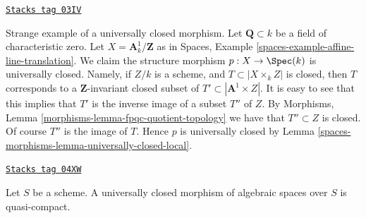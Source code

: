 \begin{example}
\label{spaces-morphisms-example-strange-universally-closed}
\href{https://stacks.math.columbia.edu/tag/03IV}{\texttt{Stacks tag 03IV}}

Strange example of a universally closed morphism.
Let $\mathbf{Q} \subset k$ be a field of characteristic zero.
Let $X = \mathbf{A}^1_k/\mathbf{Z}$ as in
Spaces, Example \ref{spaces-example-affine-line-translation}.
We claim the structure morphism $p : X \to \Spec(k)$
is universally closed.
Namely, if $Z/k$ is a scheme, and $T \subset |X \times_k Z|$ is closed,
then $T$ corresponds to a $\mathbf{Z}$-invariant closed subset of
$T' \subset |\mathbf{A}^1 \times Z|$. It is easy to see that
this implies that $T'$ is the inverse image of a subset $T''$ of
$Z$. By
Morphisms, Lemma \ref{morphisms-lemma-fpqc-quotient-topology}
we have that $T'' \subset Z$ is closed.
Of course $T''$ is the image of $T$. Hence $p$ is universally
closed by Lemma \ref{spaces-morphisms-lemma-universally-closed-local}.
\end{example}

\begin{lemma}
\label{spaces-morphisms-lemma-universally-closed-quasi-compact}
\href{https://stacks.math.columbia.edu/tag/04XW}{\texttt{Stacks tag 04XW}}

Let $S$ be a scheme.
A universally closed morphism of algebraic spaces over $S$ is quasi-compact.
\end{lemma}

